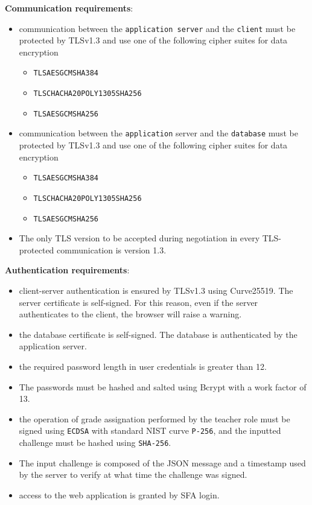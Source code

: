 \noindent\textbf{Communication requirements}:
\begin{itemize}
    \item communication between the \texttt{application server} and the \texttt{client} must be protected by TLSv1.3 and use one of the following cipher suites for data encryption
    \begin{itemize}
        \item \texttt{TLS\textunderscore AES\textunderscore GCM\textunderscore SHA384}
        \item \texttt{TLS\textunderscore CHACHA20\textunderscore POLY1305\textunderscore SHA256}
        \item \texttt{TLS\textunderscore AES\textunderscore GCM\textunderscore SHA256}
    \end{itemize} 
    \item communication between the \texttt{application} server and the \texttt{database} must be protected by TLSv1.3 and use one of the following cipher suites for data encryption
    \begin{itemize}
        \item \texttt{TLS\textunderscore AES\textunderscore GCM\textunderscore SHA384}
        \item \texttt{TLS\textunderscore CHACHA20\textunderscore POLY1305\textunderscore SHA256}
        \item \texttt{TLS\textunderscore AES\textunderscore GCM\textunderscore SHA256}
    \end{itemize}
    \item The only TLS version to be accepted during negotiation in every TLS-protected communication is version 1.3. 
\end{itemize}

\noindent\textbf{Authentication requirements}:
\begin{itemize}
    \item client-server authentication is ensured by TLSv1.3 using Curve25519. The server certificate is self-signed. For this reason, even if the server authenticates to the client, the browser will raise a warning.
    \item the database certificate is self-signed. The database is authenticated by the application server.
    \item the required password length in user credentials is greater than 12.
    \item The passwords must be hashed and salted using Bcrypt with a work factor of 13.
    \item the operation of grade assignation performed by the teacher role must be signed using \texttt{ECDSA} with standard NIST curve \texttt{P-256}, and the inputted challenge must be hashed using \texttt{SHA-256}.
    \item The input challenge is composed of the JSON message and a timestamp used by the server to verify at what time the challenge was signed.
    \item access to the web application is granted by SFA login.
\end{itemize}

